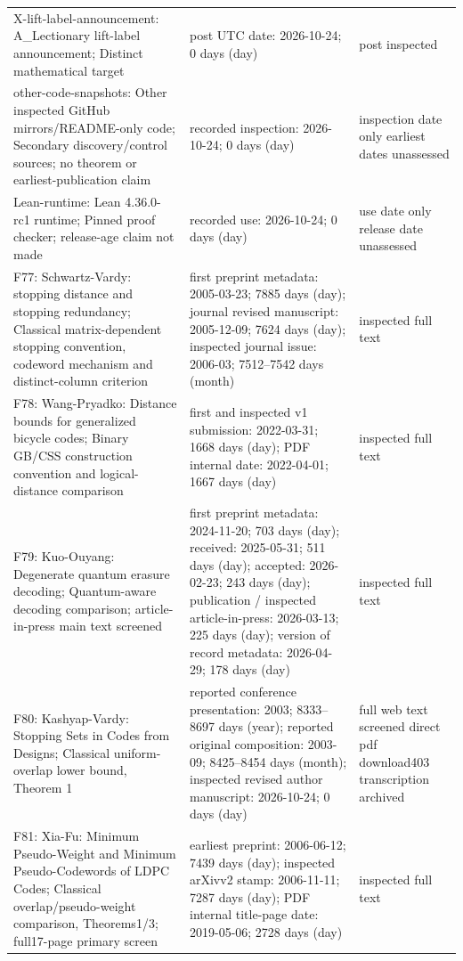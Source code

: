 {\begin{longtable}{@{}>{\raggedright\arraybackslash}p{.27\linewidth}>{\raggedright\arraybackslash}p{.47\linewidth}>{\raggedright\arraybackslash}p{.18\linewidth}@{}}
X-lift-label-announcement: A\_Lectionary lift-label announcement; Distinct mathematical target & post UTC date: 2026-10-24; 0 days (day) & post inspected\\[4pt]
other-code-snapshots: Other inspected GitHub mirrors/README-only code; Secondary discovery/control sources; no theorem or earliest-publication claim & recorded inspection: 2026-10-24; 0 days (day) & inspection date only earliest dates unassessed\\[4pt]
Lean-runtime: Lean 4.36.0-rc1 runtime; Pinned proof checker; release-age claim not made & recorded use: 2026-10-24; 0 days (day) & use date only release date unassessed\\[4pt]
F77: Schwartz-Vardy: stopping distance and stopping redundancy; Classical matrix-dependent stopping convention, codeword mechanism and distinct-column criterion & first preprint metadata: 2005-03-23; 7885 days (day); journal revised manuscript: 2005-12-09; 7624 days (day); inspected journal issue: 2006-03; 7512--7542 days (month) & inspected full text\\[4pt]
F78: Wang-Pryadko: Distance bounds for generalized bicycle codes; Binary GB/CSS construction convention and logical-distance comparison & first and inspected v1 submission: 2022-03-31; 1668 days (day); PDF internal date: 2022-04-01; 1667 days (day) & inspected full text\\[4pt]
F79: Kuo-Ouyang: Degenerate quantum erasure decoding; Quantum-aware decoding comparison; article-in-press main text screened & first preprint metadata: 2024-11-20; 703 days (day); received: 2025-05-31; 511 days (day); accepted: 2026-02-23; 243 days (day); publication / inspected article-in-press: 2026-03-13; 225 days (day); version of record metadata: 2026-04-29; 178 days (day) & inspected full text\\[4pt]
F80: Kashyap-Vardy: Stopping Sets in Codes from Designs; Classical uniform-overlap lower bound, Theorem 1 & reported conference presentation: 2003; 8333--8697 days (year); reported original composition: 2003-09; 8425--8454 days (month); inspected revised author manuscript: 2026-10-24; 0 days (day) & full web text screened direct pdf download403 transcription archived\\[4pt]
F81: Xia-Fu: Minimum Pseudo-Weight and Minimum Pseudo-Codewords of LDPC Codes; Classical overlap/pseudo-weight comparison, Theorems1/3; full17-page primary screen & earliest preprint: 2006-06-12; 7439 days (day); inspected arXivv2 stamp: 2006-11-11; 7287 days (day); PDF internal title-page date: 2019-05-06; 2728 days (day) & inspected full text\\[4pt]

\end{longtable}}
